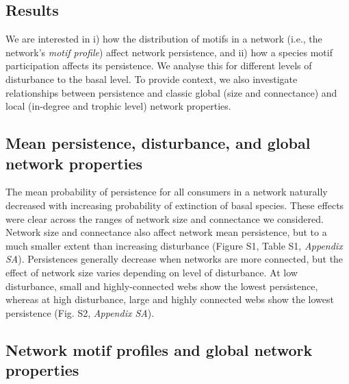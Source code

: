 \documentclass[12pt]{article}
\begin{document}
\begin{spacing}{2.0}
            

\section*{Results}

    We are interested in i) how the distribution of motifs in a network (i.e., the network's \emph{motif profile}) affect network persistence, and ii) how a species motif participation affects its persistence. We analyse this for different levels of disturbance to the basal level. To provide context, we also investigate relationships between persistence and classic global (size and connectance) and local (in-degree and trophic level) network properties.
    
    \subsection*{Mean persistence, disturbance, and global network properties}
    
        The mean probability of persistence for all consumers in a network naturally decreased with increasing probability of extinction of basal species. These effects were clear across the ranges of network size and connectance we considered. 
        Network size and connectance also affect network mean persistence, but to a much smaller extent than increasing disturbance (Figure S1, Table S1, \emph{Appendix SA}). Persistences generally decrease when networks are more connected, but the effect of network size varies depending on level of disturbance. At low disturbance, small and highly-connected webs show the lowest persistence, whereas at high disturbance, large and highly connected webs show the lowest persistence (Fig. S2, \emph{Appendix SA}).

    \subsection*{Network motif profiles and global network properties}


\end{spacing}
\end{document}
